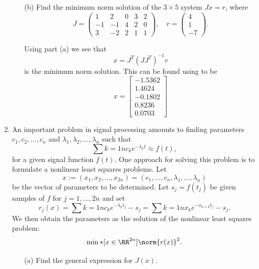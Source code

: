 \documentclass[11pt, oneside]{article}
\begin{document}
\begin{enumerate}
\begin{enumerate}
      \item[(b)]
        Find the minimum norm solution of the $3 \times 5$ system $Jx = r$,
        where
        \[
          J =
          \begin{pmatrix}
            1 & 2 & 0 & 3 & 2 \\
            -1 & -1 & 4 & 2 & 0 \\
            3 & -2 & 2 & 1 & 1
          \end{pmatrix},
          \quad
          r =
          \begin{pmatrix}
            4 \\
            1 \\
            -7
          \end{pmatrix}.
        \]

        Using part (a) we see that
        \[
          x = J^T (J J^T)^{-1} r
        \]
        is the minimum norm solution.
        This can be found using \MATLAB to be
        \[
          x =
          \begin{bmatrix}
            -1.5362 \\
            1.4624 \\
            -0.1802 \\
            0.8236 \\
            0.0703
          \end{bmatrix}
        \]
    \end{enumerate}

  \item %
    An important problem in signal processing amounts to finding parameters
    $c_1, c_2, \ldots, c_n$ and $\lambda_1, \lambda_2, \ldots, \lambda_n$ such
    that
    \[
      \sum{k=1}{n}{c_k e^{-\lambda_k t}} \approx f(t),
    \]
    for a given signal function $f(t)$.
    One approach for solving this problem is to formulate a nonlinear least
    squares problems.
    Let
    \[
      x := (x_1, x_2, \ldots, x_{2n}) = (c_1, \ldots, c_n, \lambda_1, \ldots, \lambda_n)
    \]
    be the vector of parameters to be determined.
    Let $s_j = f(t_j)$ be given samples of $f$ for $j = 1,\ldots,2n$ and set
    \[
      r_j(x) = \sum{k=1}{n}{c_k e^{-\lambda_k t_j}} - s_j = \sum{k=1}{n}{x_k e^{-x_{n+k}t_j}} - s_j.
    \]
    We then obtain the parameters as the solution of the nonlinear least squares
    problem:
    \[
      \min*[x \in \RR^{2n}]{\norm{r(x)}^2}.
    \]
    \begin{enumerate}
      \item[(a)]
        Find the general expression for $J(x)$.


\end{enumerate}
\end{enumerate}
\end{document}

